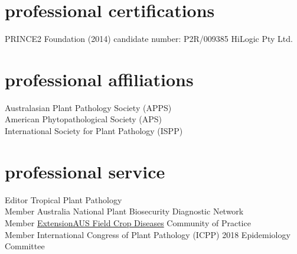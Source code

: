 \section*{professional certifications}
        PRINCE2 Foundation (2014) candidate number: P2R/009385  HiLogic Pty Ltd.

\section*{professional affiliations}
  Australasian Plant Pathology Society (APPS)\\[3 mm]
  American Phytopathological Society (APS)\\[3 mm]
  International Society for Plant Pathology (ISPP)\\

\section*{professional service}
  Editor Tropical Plant Pathology\\[3 mm]
  Member Australia National Plant Biosecurity Diagnostic Network\\[3 mm]
  Member \href{http://extensionaus.com.au/field-crop-diseases/}{ExtensionAUS Field Crop Diseases} Community of Practice\\[3 mm]
  Member International Congress of Plant Pathology (ICPP) 2018 Epidemiology Committee\\
